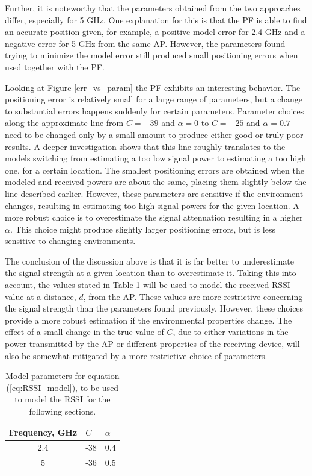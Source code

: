 \documentclass{LTHthesis}
\begin{document}
Further, it is noteworthy that the parameters obtained from the two approaches differ, especially for 5 GHz. One explanation for this is that the PF is able to find an accurate position given, for example, a positive model error for 2.4 GHz and a negative error for 5 GHz from the same AP. However, the parameters found trying to minimize the model error still produced small positioning errors when used together with the PF. 

Looking at Figure \ref{err_vs_param} the PF exhibits an interesting behavior. The positioning error is relatively small for a large range of parameters, but a change to substantial errors happens suddenly for certain parameters. Parameter choices along the approximate line from  $C=-39$ and $\alpha=0$ to $C=-25$ and $\alpha=0.7$ need to be changed only by a small amount to produce either good or truly poor results. A deeper investigation shows that this line roughly translates to the models switching from estimating a too low signal power to estimating a too high one, for a certain location. The smallest positioning errors are obtained when the modeled and received powers are about the same, placing them slightly below the line described earlier. However, these parameters are sensitive if the environment changes, resulting in estimating too high signal powers for the given location. A more robust choice is to overestimate the signal attenuation resulting in a higher $\alpha$. This choice might produce slightly larger positioning errors, but is less sensitive to changing environments.

The conclusion of the discussion above is that it is far better to underestimate the signal strength at a given location than to overestimate it. Taking this into account, the values stated in Table \ref{table:model_par} will be used to model the received RSSI value at a distance, $d$, from the AP.  These values are more restrictive concerning the signal strength than the parameters found previously. However, these choices provide a more robust estimation if the environmental properties change. The effect  of a small change in the true value of $C$, due to either variations in the power transmitted by the AP or different properties of the receiving device, will also be somewhat mitigated by a more restrictive choice of parameters.  
%
\begin{table}[!hbt]
\begin{center}
\begin{tabular}{|c|l|l|}
\hline
Frequency, GHz & $C$ & $\alpha$ \\
\hline
2.4 & -38 & 0.4 \\
\hline
5 & -36 & 0.5 \\
\hline
\end{tabular}
\end{center}
\caption{Model parameters for equation (\ref{eq:RSSI_model}), to be used to model the RSSI for the following sections.}\label{table:model_par}
\end{table}
  
\end{document}
